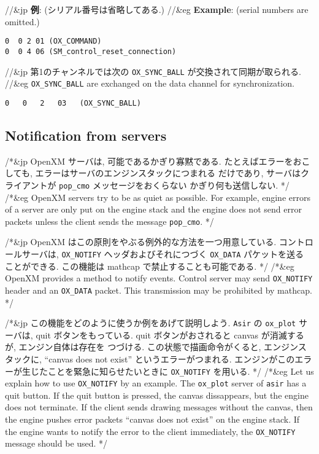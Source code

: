 \medbreak
\noindent
//&jp {\bf 例}: (シリアル番号は省略してある.) 
//&eg {\bf Example}: (serial numbers are omitted.)
\begin{verbatim}
0  0 2 01 (OX_COMMAND) 
0  0 4 06 (SM_control_reset_connection)
\end{verbatim}



//&jp 第1のチャンネルでは次の {\tt OX\_SYNC\_BALL} が交換されて同期が取られる.
//&eg {\tt OX\_SYNC\_BALL} are exchanged on the data channel for synchronization.

\begin{verbatim}
0   0   2   03   (OX_SYNC_BALL)
\end{verbatim}

\subsection{Notification from servers}

/*&jp
OpenXM サーバは, 可能であるかぎり寡黙である.
たとえばエラーをおこしても, エラーはサーバのエンジンスタックにつまれる
だけであり, サーバはクライアントが {\tt pop\_cmo} メッセージをおくらない
かぎり何も送信しない.
*/
/*&eg
OpenXM servers try to be as quiet as possible.
For example, engine errors of a server are only put on the engine stack and
the engine does not send error packets unless the client sends the message
{\tt pop\_cmo}.
*/

/*&jp
OpenXM はこの原則をやぶる例外的な方法を一つ用意している.
コントロールサーバは,
{\tt OX\_NOTIFY} ヘッダおよびそれにつづく {\tt OX\_DATA} パケットを送る
ことができる.
この機能は mathcap で禁止することも可能である.
*/
/*&eg
OpenXM provides a method to notify events.
Control server may send {\tt OX\_NOTIFY} header and an {\tt OX\_DATA} packet.
This transmission may be prohibited by mathcap.
*/

/*&jp
この機能をどのように使うか例をあげて説明しよう.
{\tt Asir} の {\tt ox\_plot} サーバは, quit ボタンをもっている.
quit ボタンがおされると canvas が消滅するが, エンジン自体は存在を
つづける.  この状態で描画命令がくると,
エンジンスタックに, ``canvas does not exist'' というエラーがつまれる.
エンジンがこのエラーが生じたことを緊急に知らせたいときに
{\tt OX\_NOTIFY} を用いる.
*/
/*&eg
Let us explain how to use {\tt OX\_NOTIFY} by an example.
The {\tt ox\_plot} server of {\tt asir} has a quit button.
If the quit button is pressed, the canvas dissappears, but the engine
does not terminate.
If the client sends drawing messages without the canvas, 
then the engine pushes
error packets ``canvas does not exist'' on the engine stack.
If the engine wants to notify the error to the client immediately,
the {\tt OX\_NOTIFY} message should be used.
*/

